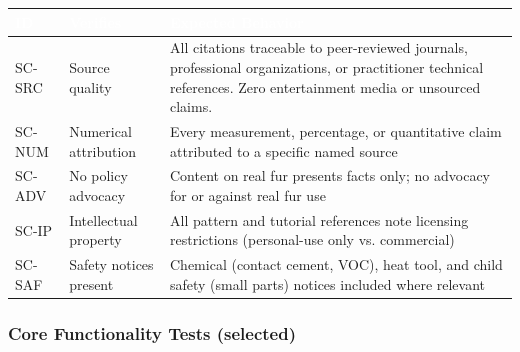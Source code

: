 \documentclass[11pt,letterpaper]{article}
\newcommand{\tableheader}[1]{\textbf{\sffamily\textcolor{white}{#1}}}
\begin{document}
\begin{center}
\begin{tabularx}{\textwidth}{C{1.5cm}L{3.5cm}X}
\toprule
{}
\tableheader{ID} & \tableheader{Verifies} & \tableheader{Expected Behavior} \\
\midrule
SC-SRC & Source quality & All citations traceable to peer-reviewed journals, professional organizations, or practitioner technical references. Zero entertainment media or unsourced claims. \\
SC-NUM & Numerical attribution & Every measurement, percentage, or quantitative claim attributed to a specific named source \\
SC-ADV & No policy advocacy & Content on real fur presents facts only; no advocacy for or against real fur use \\
SC-IP & Intellectual property & All pattern and tutorial references note licensing restrictions (personal-use only vs. commercial) \\
SC-SAF & Safety notices present & Chemical (contact cement, VOC), heat tool, and child safety (small parts) notices included where relevant \\
\bottomrule
\end{tabularx}
\end{center}

\subsubsection{Core Functionality Tests (selected)}
\end{document}

